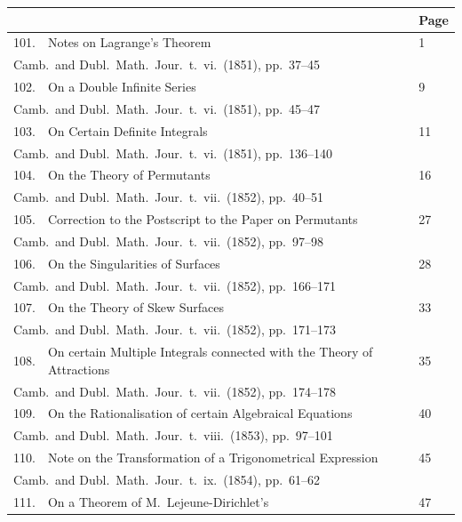 \documentclass[11pt,a4paper]{article}
\theoremstyle{plain}
\begin{document}
\begin{longtable}{rp{8cm}l}
\toprule
\multicolumn{1}{c}{} & \multicolumn{1}{c}{} & \multicolumn{1}{c}{Page}\\
\midrule
\endhead
101. & Notes on Lagrange's Theorem & 1\\
\multicolumn{3}{l}{\small Camb.\ and Dubl.\ Math.\ Jour.\ t.\ vi.\ (1851), pp.\ 37--45}\\[0.5em]
102. & On a Double Infinite Series & 9\\
\multicolumn{3}{l}{\small Camb.\ and Dubl.\ Math.\ Jour.\ t.\ vi.\ (1851), pp.\ 45--47}\\[0.5em]
103. & On Certain Definite Integrals & 11\\
\multicolumn{3}{l}{\small Camb.\ and Dubl.\ Math.\ Jour.\ t.\ vi.\ (1851), pp.\ 136--140}\\[0.5em]
104. & On the Theory of Permutants & 16\\
\multicolumn{3}{l}{\small Camb.\ and Dubl.\ Math.\ Jour.\ t.\ vii.\ (1852), pp.\ 40--51}\\[0.5em]
105. & Correction to the Postscript to the Paper on Permutants & 27\\
\multicolumn{3}{l}{\small Camb.\ and Dubl.\ Math.\ Jour.\ t.\ vii.\ (1852), pp.\ 97--98}\\[0.5em]
106. & On the Singularities of Surfaces & 28\\
\multicolumn{3}{l}{\small Camb.\ and Dubl.\ Math.\ Jour.\ t.\ vii.\ (1852), pp.\ 166--171}\\[0.5em]
107. & On the Theory of Skew Surfaces & 33\\
\multicolumn{3}{l}{\small Camb.\ and Dubl.\ Math.\ Jour.\ t.\ vii.\ (1852), pp.\ 171--173}\\[0.5em]
108. & On certain Multiple Integrals connected with the Theory of Attractions & 35\\
\multicolumn{3}{l}{\small Camb.\ and Dubl.\ Math.\ Jour.\ t.\ vii.\ (1852), pp.\ 174--178}\\[0.5em]
109. & On the Rationalisation of certain Algebraical Equations & 40\\
\multicolumn{3}{l}{\small Camb.\ and Dubl.\ Math.\ Jour.\ t.\ viii.\ (1853), pp.\ 97--101}\\[0.5em]
110. & Note on the Transformation of a Trigonometrical Expression & 45\\
\multicolumn{3}{l}{\small Camb.\ and Dubl.\ Math.\ Jour.\ t.\ ix.\ (1854), pp.\ 61--62}\\[0.5em]
111. & On a Theorem of M.\ Lejeune-Dirichlet's & 47\\

\end{longtable}
\end{document}

